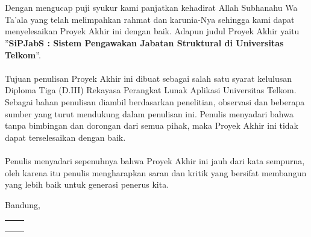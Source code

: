 \chapter*{\kataPengantar}
\noindent
Dengan mengucap puji syukur kami panjatkan kehadirat Allah Subhanahu Wa Ta’ala yang telah melimpahkan rahmat dan karunia-Nya sehingga kami dapat menyelesaikan Proyek Akhir ini dengan baik. Adapun judul Proyek Akhir yaitu ”\textbf{SiPJabS : Sistem Pengawakan Jabatan Struktural di Universitas Telkom}”. 
\\
\\
Tujuan penulisan Proyek Akhir ini dibuat sebagai salah satu syarat kelulusan Diploma Tiga (D.III) Rekayasa Perangkat Lunak Aplikasi Universitas Telkom. Sebagai bahan penulisan diambil berdasarkan penelitian, observasi dan beberapa sumber yang turut mendukung dalam penulisan ini. Penulis menyadari bahwa tanpa bimbingan dan dorongan dari semua pihak, maka Proyek Akhir ini tidak dapat terselesaikan dengan baik. 
\\
\\
Penulis menyadari sepenuhnya bahwa Proyek Akhir ini jauh dari kata sempurna, oleh karena itu penulis mengharapkan saran dan kritik yang bersifat membangun yang lebih baik untuk generasi penerus kita.
 
\vspace*{0.1cm}
\begin{flushright}
Bandung, \tanggalPengesahan\\

 \begin{tabular}{ll} \\ [0.5 cm]
 	 \\ [0.5 cm]
	\penulistu 	& \penulisdu \\
	\nimtu 		& \nimdu \\
\end{tabular}


\end{flushright}